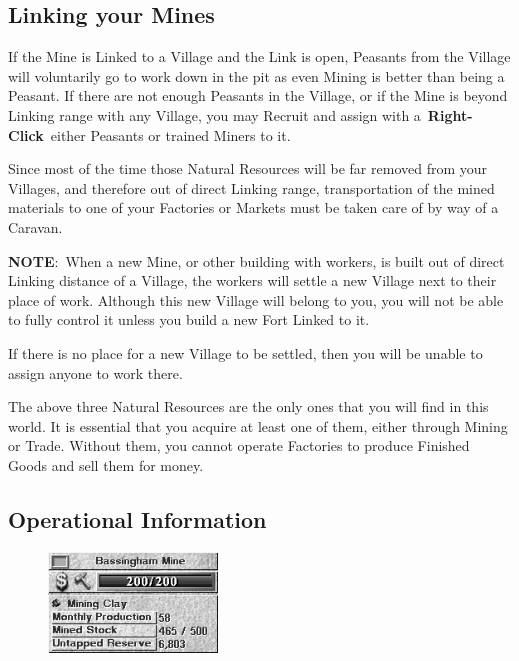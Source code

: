 \subsection{Linking your Mines}

If the Mine is Linked to a Village and the Link is open, Peasants from the Village will voluntarily go to work down in the pit as even Mining is better than being a Peasant. If there are not enough Peasants in the Village, or if the Mine is beyond Linking range with any Village, you may Recruit and assign with a \textbf{Right-Click} either Peasants or trained Miners to it.

Since most of the time those Natural Resources will be far removed from your Villages, and therefore out of direct Linking range, transportation of the mined materials to one of your Factories or Markets must be taken care of by way of a Caravan.

\textbf{NOTE}: When a new Mine, or other building with workers, is built out of direct Linking distance of a Village, the workers will settle a new Village next to their place of work. Although this new Village will belong to you, you will not be able to fully control it unless you build a new Fort Linked to it.

If there is no place for a new Village to be settled, then you will be unable to assign anyone to work there.

The above three Natural Resources are the only ones that you will find in this world. It is essential that you acquire at least one of them, either through Mining or Trade. Without them, you cannot operate Factories to produce Finished Goods and sell them for money.

\subsection{Operational Information}

\begin{figure}
	\vspace{-20pt}
	\begin{center}
		\includegraphics[width=0.4\textwidth]{Imineinfo}
	\end{center}
	\vspace{-20pt}
\end{figure}

